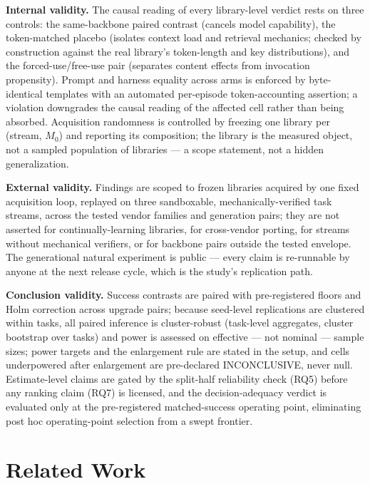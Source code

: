 \documentclass[11pt]{article}
\begin{document}
\textbf{Internal validity.} The causal reading of every library-level verdict rests on three controls: the same-backbone paired contrast (cancels model capability), the token-matched placebo (isolates context load and retrieval mechanics; checked by construction against the real library's token-length and key distributions), and the forced-use/free-use pair (separates content effects from invocation propensity). Prompt and harness equality across arms is enforced by byte-identical templates with an automated per-episode token-accounting assertion; a violation downgrades the causal reading of the affected cell rather than being absorbed. Acquisition randomness is controlled by freezing one library per (stream, $M_0$) and reporting its composition; the library is the measured object, not a sampled population of libraries --- a scope statement, not a hidden generalization.

\textbf{External validity.} Findings are scoped to frozen libraries acquired by one fixed acquisition loop, replayed on three sandboxable, mechanically-verified task streams, across the tested vendor families and generation pairs; they are not asserted for continually-learning libraries, for cross-vendor porting, for streams without mechanical verifiers, or for backbone pairs outside the tested envelope. The generational natural experiment is public --- every claim is re-runnable by anyone at the next release cycle, which is the study's replication path.

\textbf{Conclusion validity.} Success contrasts are paired with pre-registered floors and Holm correction across upgrade pairs; because seed-level replications are clustered within tasks, all paired inference is cluster-robust (task-level aggregates, cluster bootstrap over tasks) and power is assessed on effective --- not nominal --- sample sizes; power targets and the enlargement rule are stated in the setup, and cells underpowered after enlargement are pre-declared INCONCLUSIVE, never null. Estimate-level claims are gated by the split-half reliability check (RQ5) before any ranking claim (RQ7) is licensed, and the decision-adequacy verdict is evaluated only at the pre-registered matched-success operating point, eliminating post hoc operating-point selection from a swept frontier.

\section{Related Work}
\end{document}

